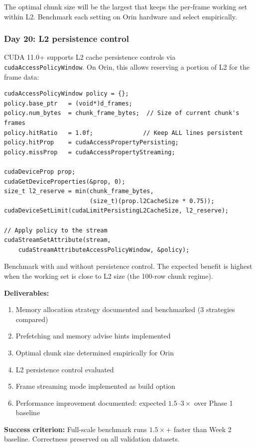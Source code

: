 \documentclass[11pt,letterpaper]{article}
\begin{document}
\noindent The optimal chunk size will be the largest that keeps the
per-frame working set within L2. Benchmark each setting on Orin hardware
and select empirically.

\subsubsection{Day 20: L2 persistence control}

CUDA 11.0+ supports L2 cache persistence controls via
\texttt{cudaAccessPolicyWindow}. On Orin, this allows reserving a
portion of L2 for the frame data:

\begin{lstlisting}[style=cudastyle]
cudaAccessPolicyWindow policy = {};
policy.base_ptr   = (void*)d_frames;
policy.num_bytes  = chunk_frame_bytes;  // Size of current chunk's frames
policy.hitRatio   = 1.0f;              // Keep ALL lines persistent
policy.hitProp    = cudaAccessPropertyPersisting;
policy.missProp   = cudaAccessPropertyStreaming;

cudaDeviceProp prop;
cudaGetDeviceProperties(&prop, 0);
size_t l2_reserve = min(chunk_frame_bytes,
                        (size_t)(prop.l2CacheSize * 0.75));
cudaDeviceSetLimit(cudaLimitPersistingL2CacheSize, l2_reserve);

// Apply policy to the stream
cudaStreamSetAttribute(stream,
    cudaStreamAttributeAccessPolicyWindow, &policy);
\end{lstlisting}

\noindent Benchmark with and without persistence control. The expected
benefit is highest when the working set is close to L2 size (the 100-row
chunk regime).

\begin{milestonebox}
\textbf{Deliverables:}
\begin{enumerate}[leftmargin=2em]
    \item Memory allocation strategy documented and benchmarked
    (3 strategies compared)
    \item Prefetching and memory advise hints implemented
    \item Optimal chunk size determined empirically for Orin
    \item L2 persistence control evaluated
    \item Frame streaming mode implemented as build option
    \item Performance improvement documented: expected $1.5$--$3\times$
    over Phase 1 baseline
\end{enumerate}
\textbf{Success criterion:} Full-scale benchmark runs $1.5\times$+ faster
than Week 2 baseline. Correctness preserved on all validation datasets.
\end{milestonebox}
\end{document}
